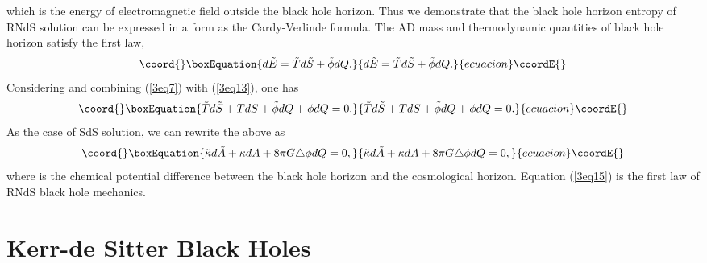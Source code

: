 \documentclass[a4paper,12pt]{article}
\providecommand{\sect}[1]{\setcounter{equation}{0}\section{#1}}
\begin{document}
which is the energy of electromagnetic field outside the black hole horizon. Thus
we demonstrate that the black hole horizon entropy of RNdS solution can be expressed 
in a form as the Cardy-Verlinde formula. The AD mass and thermodynamic quantities of black hole
horizon satisfy the first law,
\begin{equation}\coord{}\boxEquation{
\label{3eq13}
d\tilde E =\tilde Td\tilde S +\tilde \phi dQ.
}{
d\tilde E =\tilde Td\tilde S +\tilde \phi dQ.
}{ecuacion}\coordE{}\end{equation}
Considering \coordHE{} and combining (\ref{3eq7}) with (\ref{3eq13}),
one has 
\begin{equation}\coord{}\boxEquation{
\label{3eq14}
\tilde Td\tilde S +TdS +\tilde \phi dQ +\phi dQ=0.
}{
\tilde Td\tilde S +TdS +\tilde \phi dQ +\phi dQ=0.
}{ecuacion}\coordE{}\end{equation}
As the case of SdS solution, we can rewrite the above as
\begin{equation}\coord{}\boxEquation{
\label{3eq15} 
\tilde \kappa d\tilde A +\kappa dA +8\pi G \triangle \phi dQ=0,
}{
\tilde \kappa d\tilde A +\kappa dA +8\pi G \triangle \phi dQ=0,
}{ecuacion}\coordE{}\end{equation}
where \coordHE{} is the chemical potential difference
between the black hole horizon and the cosmological horizon. Equation (\ref{3eq15}) is the
first law of RNdS black hole mechanics.






\sect{Kerr-de Sitter Black Holes}
\end{document}
